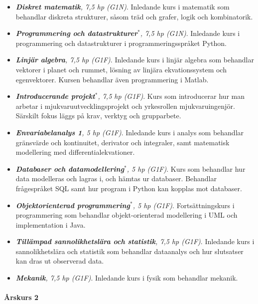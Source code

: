 \begin{itemize}
\tightlist
\item
  \emph{\textbf{Diskret matematik}, 7,5 hp (G1N)}. Inledande kurs i
  matematik som behandlar diskreta strukturer, såsom träd och grafer,
  logik och kombinatorik.
\item
  \emph{\textbf{Programmering och datastrukturer}$^*$, 7,5 hp (G1N)}.
  Inledande kurs i programmering och datastrukturer i
  programmeringsspråket Python.
\item
  \emph{\textbf{Linjär algebra}, 7,5 hp (G1F)}. Inledande kurs i linjär
  algebra som behandlar vektorer i planet och rummet, lösning av linjära
  ekvationssystem och egenvektorer. Kursen behandlar även programmering
  i Matlab.
\item
  \emph{\textbf{Introducerande projekt}$^*$, 7,5 hp (G1F)}. Kurs som
  introducerar hur man arbetar i mjukvaruutvecklingsprojekt och
  yrkesrollen mjukvaruingenjör. Särskilt fokus läggs på krav, verktyg
  och grupparbete.
\item
  \emph{\textbf{Envariabelanalys 1}, 5 hp (G1F)}. Inledande kurs i
  analys som behandlar gränsvärde och kontinuitet, derivator och
  integraler, samt matematisk modellering med differentialekvationer.
\item
  \emph{\textbf{Databaser och datamodellering}$^*$, 5 hp (G1F)}. Kurs som behandlar hur data
  modelleras och lagras i, och hämtas ur databaser. Behandlar
  frågespråket SQL samt hur program i Python kan kopplas mot databaser.
\item
  \emph{\textbf{Objektorienterad programmering}$^*$, 5 hp (G1F)}.
  Fortsättningskurs i programmering som behandlar objekt-orienterad
  modellering i UML och implementation i Java.
\item
  \emph{\textbf{Tillämpad sannolikhetslära och statistik}, 7,5 hp
  (G1F)}. Inledande kurs i sannolikhetslära och statistik som behandlar
  dataanalys och hur slutsatser kan dras ut observerad data.
\item
  \emph{\textbf{Mekanik}, 7,5 hp (G1F)}. Inledande kurs i fysik som
  behandlar mekanik.
\end{itemize}

\paragraph*{Årskurs 2}


